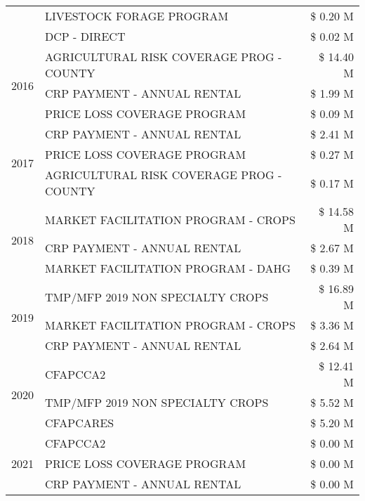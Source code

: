 \begin{tabular}{llr}
 & LIVESTOCK FORAGE PROGRAM & \$ 0.20 M \\
 & DCP - DIRECT & \$ 0.02 M \\
\cline{1-3}
\multirow[t]{3}{*}{2016} & AGRICULTURAL RISK COVERAGE PROG - COUNTY      & \$ 14.40 M \\
 & CRP PAYMENT - ANNUAL RENTAL                   & \$ 1.99 M \\
 & PRICE LOSS COVERAGE PROGRAM                   & \$ 0.09 M \\
\cline{1-3}
\multirow[t]{3}{*}{2017} & CRP PAYMENT - ANNUAL RENTAL & \$ 2.41 M \\
 & PRICE LOSS COVERAGE PROGRAM & \$ 0.27 M \\
 & AGRICULTURAL RISK COVERAGE PROG - COUNTY & \$ 0.17 M \\
\cline{1-3}
\multirow[t]{3}{*}{2018} & MARKET FACILITATION PROGRAM - CROPS & \$ 14.58 M \\
 & CRP PAYMENT - ANNUAL RENTAL & \$ 2.67 M \\
 & MARKET FACILITATION PROGRAM - DAHG & \$ 0.39 M \\
\cline{1-3}
\multirow[t]{3}{*}{2019} & TMP/MFP 2019 NON SPECIALTY CROPS & \$ 16.89 M \\
 & MARKET FACILITATION PROGRAM - CROPS & \$ 3.36 M \\
 & CRP PAYMENT - ANNUAL RENTAL & \$ 2.64 M \\
\cline{1-3}
\multirow[t]{3}{*}{2020} & CFAPCCA2 & \$ 12.41 M \\
 & TMP/MFP 2019 NON SPECIALTY CROPS & \$ 5.52 M \\
 & CFAPCARES & \$ 5.20 M \\
\cline{1-3}
\multirow[t]{3}{*}{2021} & CFAPCCA2 & \$ 0.00 M \\
 & PRICE LOSS COVERAGE PROGRAM & \$ 0.00 M \\
 & CRP PAYMENT - ANNUAL RENTAL & \$ 0.00 M \\
\cline{1-3}
\bottomrule
\end{tabular}
